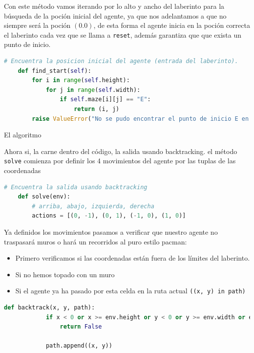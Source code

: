 \documentclass[a4paper,12pt]{article}
\begin{document}
Con este método vamos iterando por lo alto y ancho del laberinto para la búsqueda de la 
poción inicial del agente, ya que nos adelantamos a que no siempre será la poción $(0.0)$, 
de esta forma el agente inicia en la poción correcta el laberinto cada vez que se llama 
a \texttt{reset}, además garantiza que que exista un punto de inicio.

\begin{lstlisting}[style=mystylepython, language=Python, caption= metodo find start]        
    # Encuentra la posicion inicial del agente (entrada del laberinto).
    def find_start(self):
        for i in range(self.height):
            for j in range(self.width):
                if self.maze[i][j] == "E":
                    return (i, j)
        raise ValueError("No se pudo encontrar el punto de inicio E en el laberinto")
\end{lstlisting}

\begin{center}
    \Large{El algoritmo}
\end{center}

Ahora si, la carne dentro del código, la salida usando backtracking. el método \texttt{solve} comienza por 
definir los 4 movimientos del agente por las tuplas de las coordenadas 

\begin{lstlisting}[style=mystylepython, language=Python, caption= Movimientos del agente]
# Encuentra la salida usando backtracking
    def solve(env):
        # arriba, abajo, izquierda, derecha
        actions = [(0, -1), (0, 1), (-1, 0), (1, 0)]  
\end{lstlisting}

Ya definidos los movimientos pasamos a verificar que nuestro agente no traspasará muros o hará un 
recorridos al puro estilo pacman:
\begin{itemize}
    \item Primero verificamos si las coordenadas están fuera de los límites del laberinto.
    \item Si no hemos topado con un muro
    \item Si el agente ya ha pasado por esta celda en la ruta actual \texttt{((x, y) in path)}
\end{itemize}

\begin{lstlisting}[style=mystylepython, language=Python, caption= Validación de movimientos]
        def backtrack(x, y, path):
            if x < 0 or x >= env.height or y < 0 or y >= env.width or env.maze[x][y] == 1 or (x, y) in path:
                return False
    
            path.append((x, y))
\end{lstlisting}
\end{document}
